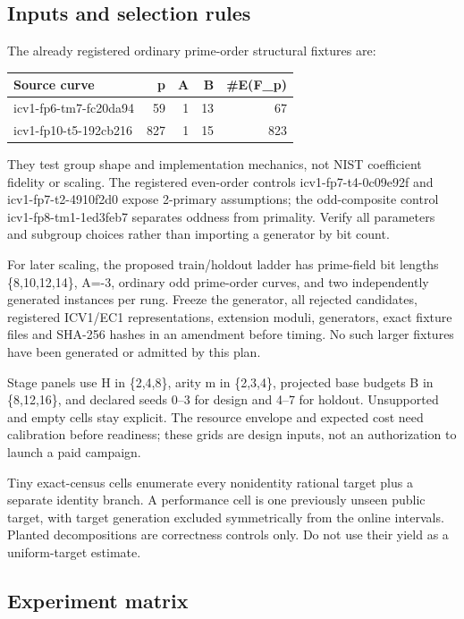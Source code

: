 \documentclass[
  10pt,
]{article}
\begin{document}
\subsection{Inputs and selection
rules}\label{inputs-and-selection-rules}

The already registered ordinary prime-order structural fixtures are:

\begin{longtable}[]{@{}lrrrr@{}}
\toprule\noalign{}
Source curve & p & A & B & \#E(F\_p) \\
\midrule\noalign{}
\endhead
\bottomrule\noalign{}
\endlastfoot
icv1-fp6-tm7-fc20da94 & 59 & 1 & 13 & 67 \\
icv1-fp10-t5-192cb216 & 827 & 1 & 15 & 823 \\
\end{longtable}

They test group shape and implementation mechanics, not NIST coefficient
fidelity or scaling. The registered even-order controls
icv1-fp7-t4-0c09e92f and icv1-fp7-t2-4910f2d0 expose 2-primary
assumptions; the odd-composite control icv1-fp8-tm1-1ed3feb7 separates
oddness from primality. Verify all parameters and subgroup choices
rather than importing a generator by bit count.

For later scaling, the proposed train/holdout ladder has prime-field bit
lengths \{8,10,12,14\}, A=-3, ordinary odd prime-order curves, and two
independently generated instances per rung. Freeze the generator, all
rejected candidates, registered ICV1/EC1 representations, extension
moduli, generators, exact fixture files and SHA-256 hashes in an
amendment before timing. No such larger fixtures have been generated or
admitted by this plan.

Stage panels use H in \{2,4,8\}, arity m in \{2,3,4\}, projected base
budgets B in \{8,12,16\}, and declared seeds 0--3 for design and 4--7
for holdout. Unsupported and empty cells stay explicit. The resource
envelope and expected cost need calibration before readiness; these
grids are design inputs, not an authorization to launch a paid campaign.

Tiny exact-census cells enumerate every nonidentity rational target plus
a separate identity branch. A performance cell is one previously unseen
public target, with target generation excluded symmetrically from the
online intervals. Planted decompositions are correctness controls only.
Do not use their yield as a uniform-target estimate.

\subsection{Experiment matrix}\label{experiment-matrix}
\end{document}
